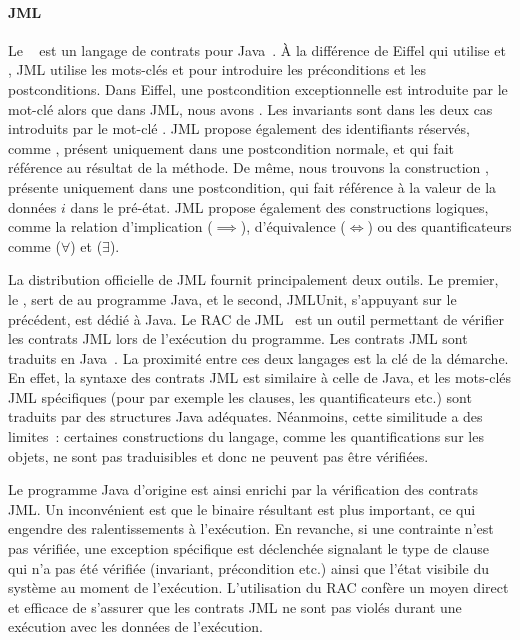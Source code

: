 \paragraph{JML} Le ~ est un langage
de contrats pour Java~. À la différence de Eiffel qui utilise
 et , JML utilise les mots-clés  et
 pour introduire les préconditions et les postconditions. Dans
Eiffel, une postcondition exceptionnelle est introduite par le mot-clé
 alors que dans JML, nous avons . Les invariants sont
dans les deux cas introduits par le mot-clé . JML propose
également des identifiants réservés, comme \aresult, présent uniquement dans une
postcondition normale, et qui fait référence au résultat de la méthode.  De
même, nous trouvons la construction , présente uniquement dans une
postcondition, qui fait référence à la valeur de la données $i$ dans le
pré-état. JML propose également des constructions logiques, comme la relation
d'implication ($\implies$), d'équivalence ($\Longleftrightarrow$) ou des
quantificateurs comme  ($\forall$) et
 ($\exists$).

La distribution officielle de JML fournit principalement deux outils.  Le
premier, le , sert de
 au programme Java, et le second, JMLUnit, s'appuyant sur
le précédent, est dédié à Java. Le RAC de JML~ est un outil
permettant de vérifier les contrats JML lors de l'exécution du programme. Les
contrats JML sont traduits en Java~. La proximité entre ces
deux langages est la clé de la démarche. En effet, la syntaxe des contrats JML
est similaire à celle de Java, et les mots-clés JML spécifiques (pour par
exemple les clauses, les quantificateurs etc.) sont traduits par des structures
Java adéquates. Néanmoins, cette similitude a des limites~: certaines
constructions du langage, comme les quantifications sur les objets, ne sont pas
traduisibles et donc ne peuvent pas être vérifiées.

Le programme Java d'origine est ainsi enrichi par la vérification des contrats
JML. Un inconvénient est que le binaire résultant est plus important, ce qui
engendre des ralentissements à l'exécution. En revanche, si une contrainte n'est
pas vérifiée, une exception spécifique est déclenchée signalant le type de
clause qui n'a pas été vérifiée (invariant, précondition etc.) ainsi que l'état
visibile du système au moment de l'exécution. L'utilisation du RAC confère un
moyen direct et efficace de s'assurer que les contrats JML ne sont pas violés
durant une exécution avec les données de l'exécution.


